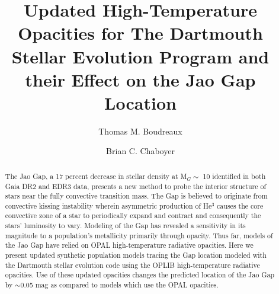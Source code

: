 \documentclass[twocolumn]{src/aastex631}
\begin{document}
\title{Updated High-Temperature Opacities for The Dartmouth Stellar Evolution
Program and their Effect on the Jao Gap Location}


\author[0000-0002-2600-7513]{Thomas M. Boudreaux}

\author[0000-0003-3096-4161]{Brian C. Chaboyer}


\begin{abstract}

	The Jao Gap, a 17 percent decrease in stellar density at M$_{G} \sim$ 10
	identified in both Gaia DR2 and EDR3 data, presents a new method to probe
	the interior structure of stars near the fully convective transition mass.
	The Gap is believed to originate from convective kissing instability
	wherein asymmetric production of He$^{3}$ causes the core convective zone
	of a star to periodically expand and contract and consequently the stars’
	luminosity to vary. Modeling of the Gap has revealed a sensitivity in its
	magnitude to a population’s metallicity primarily through opacity. Thus
	far, models of the Jao Gap have relied on OPAL high-temperature radiative
	opacities. Here we present updated synthetic population models tracing the
	Gap location modeled with the Dartmouth stellar evolution code using the
	OPLIB high-temperature radiative opacities. Use of these updated opacities
	changes the predicted location of the Jao Gap by $\sim$0.05 mag as compared
	to models which use the OPAL opacities.

\end{abstract}














{}

\end{document}
